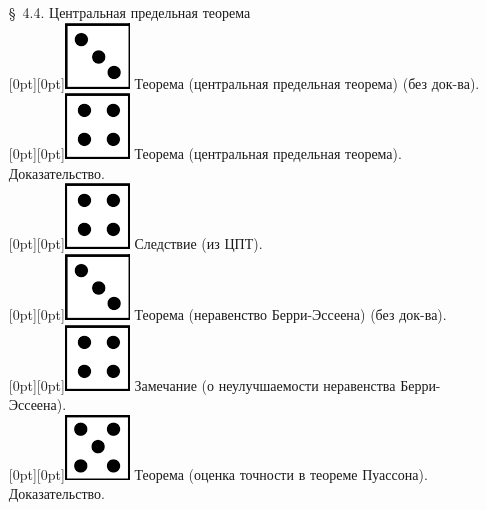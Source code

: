 \documentclass[10pt]{amsart}
\begin{document}
\begin{enumerate}
\begin{enumerate}
\item[\S\, 4.4.] Центральная предельная теорема \\
 \raisebox{-1pt}[0pt][0pt]{\includegraphics[width=0.02\linewidth]{3.png}} Теорема (центральная предельная теорема) (без док-ва). \\
 \raisebox{-1pt}[0pt][0pt]{\includegraphics[width=0.02\linewidth]{4.png}} Теорема (центральная предельная теорема). Доказательство. \\        
 \raisebox{-1pt}[0pt][0pt]{\includegraphics[width=0.02\linewidth]{4.png}} Следствие (из ЦПТ). \\
 \raisebox{-1pt}[0pt][0pt]{\includegraphics[width=0.02\linewidth]{3.png}} Теорема (неравенство Берри-Эссеена) (без док-ва). \\
 \raisebox{-1pt}[0pt][0pt]{\includegraphics[width=0.02\linewidth]{4.png}} Замечание (о неулучшаемости неравенства Берри-Эссеена). \\
 \raisebox{-1pt}[0pt][0pt]{\includegraphics[width=0.02\linewidth]{5.png}} Теорема (оценка точности в теореме Пуассона). Доказательство. \\
    

\end{enumerate}
\end{enumerate}
\end{document}

